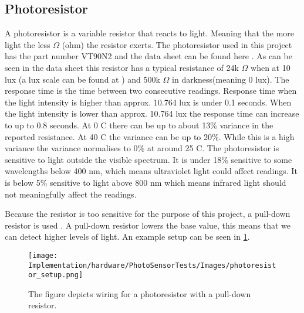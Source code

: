 \subsection{Photoresistor}\label{sub:photoresistor}
A photoresistor is a variable resistor that reacts to light. Meaning that the more light the less $\Omega$ (ohm) the resistor exerts. The photoresistor used in this project has the part number VT90N2 and the data sheet can be found here \cite{photoresistor_sheet}. As can be seen in the data sheet this resistor has a typical resistance of 24k $\Omega$ when at 10 lux (a lux scale can be found at \cite{lux_scale}) and 500k $\Omega$ in darkness(meaning 0 lux). The response time is the time between two consecutive readings. Response time when the light intensity is higher than approx. 10.764 lux is under 0.1 seconds. When the light intensity is lower than approx. 10.764 lux the response time can increase to up to 0.8 seconds. At 0 \degree C there can be up to about 13\% variance in the reported resistance. At 40 \degree C the variance can be up to 20\%. While this is a high variance the variance normalises to 0\% at around 25 \degree C. The photoresistor is sensitive to light outside the visible spectrum. It is under 18\% sensitive to some wavelengths below 400 nm, which means ultraviolet light could affect readings. It is below 5\% sensitive to light above 800 nm which means infrared light should not meaningfully affect the readings.

Because the resistor is too sensitive for the purpose of this project, a pull-down resistor is used \cite{pulldown_resistor}. A pull-down resistor lowers the base value, this means that we can detect higher levels of light. An example setup can be seen in \cref{fig:arduino_photoresistor_wiring}.

\begin{figure}[htbp]
  \centering
  \texttt{[image: Implementation/hardware/PhotoSensorTests/Images/photoresistor\_setup.png]}
  \caption[Photoresistor]{The figure depicts wiring for a photoresistor with a pull-down resistor.}\label{fig:arduino_photoresistor_wiring}
\end{figure}
